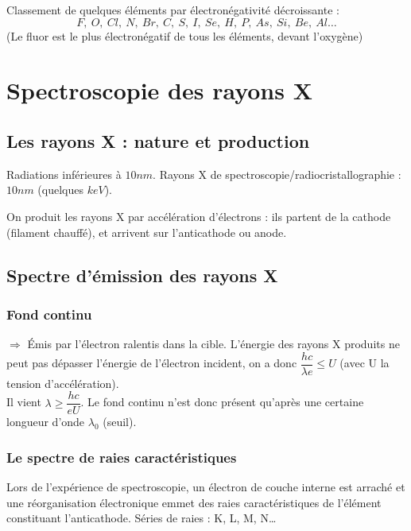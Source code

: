 \documentclass[13pt, twoside, a4paper, french, tikz]{report}
\begin{document}
    Classement de quelques éléments par électronégativité décroissante :
    \[F,\ O,\ Cl,\ N,\ Br,\ C,\ S,\ I,\ Se,\ H,\ P,\ As,\ Si,\ Be,\ Al\ldots\]
    (Le fluor est le plus électronégatif de tous les éléments, devant l'oxygène)


\chapter{Spectroscopie des rayons X}\label{ch:spectroscopie-des-rayons-x}
  
  
  \section{Les rayons X : nature et production}\label{sec:les-rayons-x-:-nature-et-production}
    
    Radiations inférieures à $10 nm$. Rayons X de spectroscopie/radiocristallographie : $10 nm$ (quelques $keV$).
    
    On produit les rayons X par accélération d'électrons : ils partent de la cathode (filament chauffé), et arrivent sur l'anticathode ou anode.
  
  
  \section{Spectre d'émission des rayons X}\label{sec:spectre-d'emission-des-rayons-x}
    
    \subsection{Fond continu}\label{subsec:fond-continu}
      
      $\Rightarrow$ Émis par l'électron ralentis dans la cible.
      L'énergie des rayons X produits ne peut pas dépasser l'énergie de l'électron incident, on a donc $\dfrac{hc}{\lambda e} \le U$ (avec U la tension d'accélération).\\
      Il vient $\lambda \ge \dfrac{hc}{eU}$.
      Le fond continu n'est donc présent qu'après une certaine longueur d'onde $\lambda_{0}$ (seuil).
    
    \subsection{Le spectre de raies caractéristiques}\label{subsec:le-spectre-de-raies-caracteristiques}
      
      Lors de l'expérience de spectroscopie, un électron de couche interne est arraché et une réorganisation électronique emmet des raies caractéristiques de l'élément constituant l'anticathode.
      Séries de raies : K, L, M, N\ldots\\
      
\end{document}

